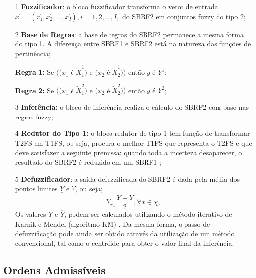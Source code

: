 \documentclass[tcc,capa]{texufpel}
\begin{document}
\begin{itemize}
    \item [1] \textbf{Fuzzificador}: o bloco fuzzificador transforma o vetor de entrada $x^{'} = (x^{'}_{1},x^{'}_{2}, \dots , x^{'}_{I}), i = 1,2,\dots, I,$ do SBRF2 em conjuntos fuzzy do tipo 2;
    
    \item [2] \textbf{Base de Regras}: a base de regras do SBRF2 permanece a mesma forma do tipo 1. A diferença entre SBRF1 e SBRF2 está na natureza das funções de pertinência; 
    
    \textbf{Regra 1:} Se $((x_{1}$ é $\tilde{X}^{1}_{1})$ e $(x_{2}$ é $\tilde{X}^{1}_{2}))$ então $y$ é $Y^{1}$;
    
    \textbf{Regra 2:} Se $((x_{1}$ é $\tilde{X}^{2}_{1})$ e $(x_{2}$ é $\tilde{X}^{2}_{2}))$ então $y$ é $Y^{2}$;
    
    
    \item [3] \textbf{Inferência:} o bloco de inferência realiza o cálculo do SBRF2 com base nas regras fuzzy;
    
    \item [4] \textbf{Redutor do Tipo 1:} o bloco redutor do tipo 1 tem função de transformar T2FS em T1FS, ou seja, procura o melhor T1FS que representa o T2FS e que deve satisfazer a seguinte premissa: quando toda a incerteza desaparecer, o resultado do SBRF2 é reduzido em um SBRF1 \citep{mendel2001uncertain};
    
    \item [5] \textbf{Defuzzificador}: a saída defuzzificada do SBRF2 é dada pela média dos pontos limites $\underline{Y}$ e $\overline{Y}$, ou seja;
    \begin{equation}
	  Y_x_= \frac{\underline{Y}+\overline{Y}}{2} , \forall x \in \chi,
	\end{equation}
Os valores $\underline{Y}$ e $\overline{Y}$, podem ser calculados utilizando o método iterativo de Karnik e Mendel (algoritmo KM) \cite{rizol2011logica}.
Da mesma forma, o passo de defuzzificação pode ainda ser obtido através da utilização de um método convencional, tal como o centróide para obter o valor final da inferência.

	
\end{itemize}


\subsection{Ordens Admissíveis} \label{subsecOrdensAdmissiveis}
\end{document}
